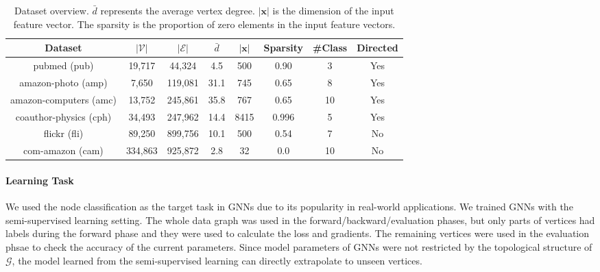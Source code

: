 \begin{table}
    \centering
    \small
    \begin{tabular}{cccccccc}
        \toprule
        Dataset                                                 & $|\mathcal{V}|$ & $|\mathcal{E}|$ & $\bar{d}$ & $|\boldsymbol{x}|$ & Sparsity & \#Class & Directed \\
        \midrule
        pubmed (pub) \cite{yang2016_revisiting_semisupervised}  & 19,717          & 44,324          & 4.5       & 500                & 0.90     & 3       & Yes      \\
        amazon-photo (amp) \cite{shchur2018_pitfall_of_gnn}     & 7,650           & 119,081         & 31.1      & 745                & 0.65     & 8       & Yes      \\
        amazon-computers (amc) \cite{shchur2018_pitfall_of_gnn} & 13,752          & 245,861         & 35.8      & 767                & 0.65     & 10      & Yes      \\
        coauthor-physics (cph) \cite{shchur2018_pitfall_of_gnn} & 34,493          & 247,962         & 14.4      & 8415               & 0.996    & 5       & Yes      \\
        flickr (fli) \cite{zeng2020_graphsaint}                 & 89,250          & 899,756         & 10.1      & 500                & 0.54     & 7       & No       \\
        com-amazon (cam) \cite{ang2012_defining}                & 334,863         & 925,872         & 2.8       & 32                 & 0.0      & 10      & No       \\
        \bottomrule
    \end{tabular}
    \caption{Dataset overview. $\bar{d}$ represents the average vertex degree. $|\boldsymbol{x}|$ is the dimension of the input feature vector. The sparsity is the proportion of zero elements in the input feature vectors.}
    \label{tab:dataset_overview}
\end{table}

\paragraph{Learning Task}
We used the node classification as the target task in GNNs due to its popularity in real-world applications.
We trained GNNs with the semi-supervised learning setting.
The whole data graph was used in the forward/backward/evaluation phases, but only parts of vertices had labels during the forward phase and they were used to calculate the loss and gradients.
The remaining vertices were used in the evaluation phsae to check the accuracy of the current parameters.
Since model parameters of GNNs were not restricted by the topological structure of $\mathcal{G}$, the model learned from the semi-supervised learning can directly extrapolate to unseen vertices.

